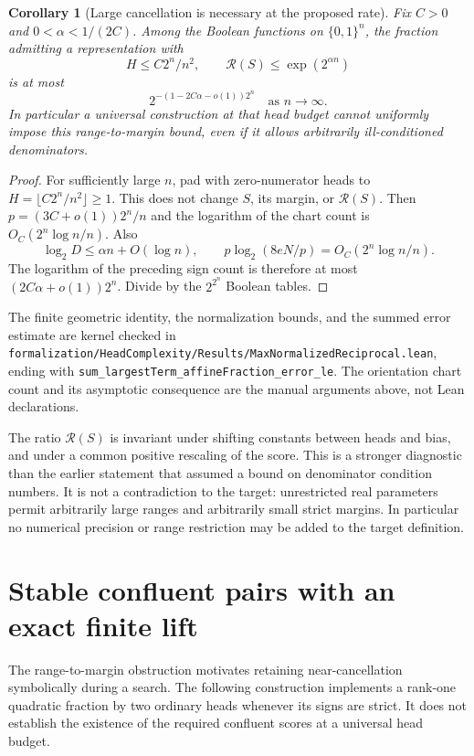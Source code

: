 \documentclass[11pt]{article}
\newtheorem{corollary}[proposition]{Corollary}
\newcommand{\Qn}{\{0,1\}^n}
\begin{document}
\begin{corollary}[Large cancellation is necessary at the proposed rate]
Fix $C>0$ and $0<\alpha<1/(2C)$. Among the Boolean functions on
$\Qn$, the fraction admitting a representation with
\[
 H\le C2^n/n^2,\qquad
 \mathcal R(S)\le\exp(2^{\alpha n})
\]
is at most
\[
 2^{-(1-2C\alpha-o(1))2^n}
 \quad\text{as }n\longrightarrow\infty.
\]
In particular a universal construction at that head budget cannot
uniformly impose this range-to-margin bound, even if it allows
arbitrarily ill-conditioned denominators.
\end{corollary}
\begin{proof}
For sufficiently large $n$, pad with zero-numerator heads to
$H=\lfloor C2^n/n^2\rfloor\ge1$. This does not change $S$, its
margin, or $\mathcal R(S)$. Then
$p=(3C+o(1))2^n/n$ and the logarithm of the chart count is
$O_C(2^n\log n/n)$. Also
\[
 \log_2 D\le\alpha n+O(\log n),\qquad
 p\log_2(8eN/p)=O_C(2^n\log n/n).
\]
The logarithm of the preceding sign count is therefore at most
$(2C\alpha+o(1))2^n$. Divide by the $2^{2^n}$ Boolean tables.
\end{proof}

The finite geometric identity, the normalization bounds, and the
summed error estimate are kernel checked in
\texttt{formalization/HeadComplexity/Results/MaxNormalizedReciprocal.lean},
ending with \texttt{sum\_largestTerm\_affineFraction\_error\_le}.
The orientation chart count and its asymptotic consequence are the
manual arguments above, not Lean declarations.

The ratio $\mathcal R(S)$ is invariant under shifting constants between
heads and bias, and under a common positive rescaling of the score.
This is a stronger diagnostic than the earlier statement that assumed a
bound on denominator condition numbers. It is not a contradiction to
the target: unrestricted real parameters permit arbitrarily large
ranges and arbitrarily small strict margins. In particular no numerical
precision or range restriction may be added to the target definition.


\section{Stable confluent pairs with an exact finite lift}

The range-to-margin obstruction motivates retaining near-cancellation
symbolically during a search. The following construction implements a
rank-one quadratic fraction by two ordinary heads whenever its signs
are strict. It does not establish the existence of the required
confluent scores at a universal head budget.
\end{document}
